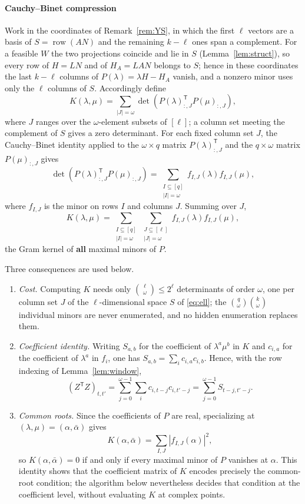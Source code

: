 \documentclass[journal]{IEEEtran}
\theoremstyle{plainn}
\theoremstyle{remark}
\begin{document}
\paragraph*{Cauchy--Binet compression}\label{sec:cb}
Work in the coordinates of Remark~\ref{rem:YS}, in which the first $\ell$ vectors are a basis of
$S=\operatorname{row}(AN)$ and the remaining $k-\ell$ ones span a complement. For a feasible $W$ the
two projections coincide and lie in $S$ (Lemma~\ref{lem:struct}), so every row of $H=LN$ and of
$H_A=LAN$ belongs to $S$; hence in these coordinates the last $k-\ell$ columns of $P(\lambda)=\lambda
H-H_A$ vanish, and a nonzero minor uses only the $\ell$ columns of $S$. Accordingly define
\[
K(\lambda,\mu)=\sum_{|J|=\omega}
\det\left(P(\lambda)_{:,J}^{\mathsf T}P(\mu)_{:,J}\right),
\]
where $J$ ranges over the $\omega$-element subsets of $[\ell]$; a column set meeting the
complement of $S$ gives a zero determinant. For each fixed column set $J$, the Cauchy--Binet identity
\cite[Ch.~0]{hj13} applied
to the $\omega\times q$ matrix $P(\lambda)_{:,J}^{\mathsf T}$ and the
$q\times\omega$ matrix $P(\mu)_{:,J}$ gives
\[
\det\!\left(P(\lambda)_{:,J}^{\mathsf T}P(\mu)_{:,J}\right)
=\sum_{\substack{I\subseteq[q]\\ |I|=\omega}}
f_{I,J}(\lambda)f_{I,J}(\mu),
\]
where $f_{I,J}$ is the minor on rows $I$ and columns $J$. Summing over $J$,
\[
K(\lambda,\mu)=\sum_{\substack{I\subseteq[q]\\ |I|=\omega}}
\sum_{\substack{J\subseteq[\ell]\\ |J|=\omega}}
f_{I,J}(\lambda)f_{I,J}(\mu),
\]
the Gram kernel of \textbf{all} maximal minors of $P$.

Three consequences are used below.
\begin{enumerate}[label=(\roman*)]
	\item\label{item:cost} \emph{Cost.} Computing $K$ needs only
	$\binom{\ell}{\omega}\le2^{\ell}$ determinants of order $\omega$, one per
	column set $J$ of the $\ell$-dimensional space $S$ of \eqref{eq:ell}; the
	$\binom q\omega\binom k\omega$ individual minors are never enumerated,
	and no hidden enumeration replaces them.
	\item\label{item:coef} \emph{Coefficient identity.} Writing $S_{a,b}$
	for the coefficient of $\lambda^a\mu^b$ in $K$ and $c_{i,a}$ for the
	coefficient of $\lambda^a$ in $f_i$, one has
	$S_{a,b}=\sum_i c_{i,a}c_{i,b}$. Hence, with the row indexing of
	Lemma~\ref{lem:window},
	\[
	(Z^{\mathsf T}Z)_{t,t'}
	=\sum_{j=0}^{\omega-1}\sum_i c_{i,t-j}c_{i,t'-j}
	=\sum_{j=0}^{\omega-1}S_{t-j,t'-j}.
	\]
	\item\label{item:roots} \emph{Common roots.} Since the coefficients of
	$P$ are real, specializing at $(\lambda,\mu)=(\alpha,\bar\alpha)$ gives
	\[
	K(\alpha,\bar\alpha)
	=\sum_{I,J}\left|f_{I,J}(\alpha)\right|^2,
	\]
	so $K(\alpha,\bar\alpha)=0$ if and only if every maximal minor of $P$
	vanishes at $\alpha$. This identity shows that the coefficient matrix of
	$K$ encodes precisely the common-root condition; the algorithm below
	nevertheless decides that condition at the coefficient level, without
	evaluating $K$ at complex points.
\end{enumerate}
\end{document}
